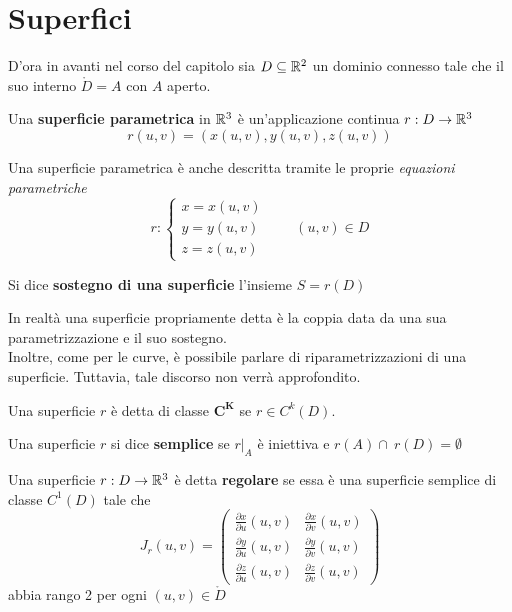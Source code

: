 \chapter{Superfici}
D'ora in avanti nel corso del capitolo sia $D \subseteq \mathbb{R}^2$ un dominio connesso tale che il suo interno $\mathring{D}=A$ con $A$ aperto.
\begin{definition} \label{Def: Superficie parametrica}
    Una \textbf{superficie parametrica} in $\mathbb{R}^3$ è un'applicazione continua $r: D \to \mathbb{R}^3$
    \begin{equation}
        r(u,v)=(x(u,v), y(u,v), z(u,v))
    \end{equation}
\end{definition}
Una superficie parametrica è anche descritta tramite le proprie \textit{equazioni parametriche}
\begin{equation}
    r: \begin{cases}
        x=x(u,v)\\
        y=y(u,v)\\
        z=z(u,v)
    \end{cases}
    \qquad (u,v) \in D
\end{equation}
\begin{definition} \label{Def: Sostegno di una superficie}
    Si dice \textbf{sostegno di una superficie} l'insieme $S=r(D)$
\end{definition}
In realtà una superficie propriamente detta è la coppia data da una sua parametrizzazione e il suo sostegno.\\
Inoltre, come per le curve, è possibile parlare di riparametrizzazioni di una superficie. Tuttavia, tale discorso non verrà approfondito.
\begin{definition} \label{Def: Superficie di classe C^k}
    Una superficie $r$ è detta di classe $\mathbf{C^K}$ se $r \in C^k(D)$.
\end{definition}
\begin{definition} \label{Def: Superficie semplice}
    Una superficie $r$ si dice \textbf{semplice} se $r|_A$ è iniettiva e $r(A) \cap\ r(D)= \emptyset$
\end{definition}
\begin{definition} \label{Def: Superficie regolare}
    Una superficie $r: D \to \mathbb{R}^3$ è detta \textbf{regolare} se essa è una superficie semplice di classe $C^1(D)$ tale che
    \begin{equation}
        J_r(u,v)= \begin{pmatrix}
            \frac{\partial x}{\partial u}(u,v) & \frac{\partial x}{\partial v}(u,v)\\
            \frac{\partial y}{\partial u}(u,v) & \frac{\partial y}{\partial v}(u,v)\\
            \frac{\partial z}{\partial u}(u,v) & \frac{\partial z}{\partial v}(u,v)
        \end{pmatrix}
    \end{equation}
abbia rango 2 per ogni $(u,v) \in \mathring{D}$
\end{definition}
